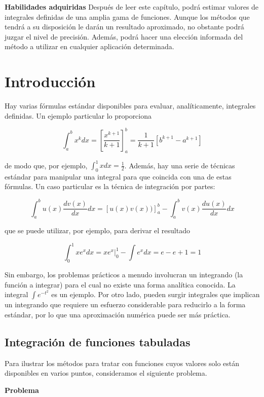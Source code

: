 \documentclass[12pt, letterpaper, twoside]{article}
\begin{document}
\hfill

\textbf{Habilidades adquiridas} Después de leer este capítulo, podrá estimar valores de integrales definidas de una amplia gama de funciones. Aunque los métodos que tendrá a su disposición le darán un resultado aproximado, no obstante podrá juzgar el nivel de precisión. Además, podrá hacer una elección informada del método a utilizar en cualquier aplicación determinada.

\section{Introducción}

Hay varias fórmulas estándar disponibles para evaluar, analíticamente, integrales definidas. Un ejemplo particular lo proporciona

\[
\int_a^b x^k dx = \left [ \frac{x^{k+1}}{k+1} \right ]_a^b = \frac{1}{k+1}[b^{k+1} - a^{k+1}]
\]

de modo que, por ejemplo, $\int_0^1 x dx = \frac{1}{2}$. Además, hay una serie de técnicas estándar para manipular una integral para que coincida con una de estas fórmulas. Un caso particular es la técnica de integración por partes:

\[
\int_a^b u(x) \frac{dv(x)}{dx} dx = [u(x) v(x))]_a^b - \int_a^b v(x) \frac{du(x)}{dx} dx
\]

que se puede utilizar, por ejemplo, para derivar el resultado

\[
\int_0^1 x e^x dx = x e^x |_0^1 - \int e^x dx = e-e+1 = 1
\]

Sin embargo, los problemas prácticos a menudo involucran un integrando (la función a integrar) para el cual no existe una forma analítica conocida. 
La integral $\int e^{-t^2}$  es un ejemplo. Por otro lado, pueden surgir integrales que implican un integrando que requiere un esfuerzo considerable para reducirlo a la forma estándar, por lo que una aproximación numérica puede ser más práctica.

\subsection{Integración de funciones tabuladas}

Para ilustrar los métodos para tratar con funciones cuyos valores solo están disponibles en varios puntos, consideramos el siguiente problema.

\hfill

\textbf{Problema}

\hfill
\end{document}
